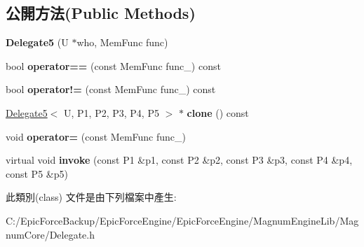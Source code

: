 \subsection*{公開方法(Public Methods)}
\begin{DoxyCompactItemize}
\item 
{\bfseries Delegate5} (U $\ast$who, Mem\+Func func)\hypertarget{class_magnum_1_1_delegate5_ac4e6c739aa5e8150b804e6457fdd6e50}{}\label{class_magnum_1_1_delegate5_ac4e6c739aa5e8150b804e6457fdd6e50}

\item 
bool {\bfseries operator==} (const Mem\+Func func\+\_\+) const \hypertarget{class_magnum_1_1_delegate5_a86f72d91bcddd075e49c60f88f0ca1d0}{}\label{class_magnum_1_1_delegate5_a86f72d91bcddd075e49c60f88f0ca1d0}

\item 
bool {\bfseries operator!=} (const Mem\+Func func\+\_\+) const \hypertarget{class_magnum_1_1_delegate5_a7b9775f4e023046f426041f2ba5ce5fc}{}\label{class_magnum_1_1_delegate5_a7b9775f4e023046f426041f2ba5ce5fc}

\item 
\hyperlink{class_magnum_1_1_delegate5}{Delegate5}$<$ U, P1, P2, P3, P4, P5 $>$ $\ast$ {\bfseries clone} () const \hypertarget{class_magnum_1_1_delegate5_accf265c3b4d4e95470a3b8b3af7fe3d0}{}\label{class_magnum_1_1_delegate5_accf265c3b4d4e95470a3b8b3af7fe3d0}

\item 
void {\bfseries operator=} (const Mem\+Func func\+\_\+)\hypertarget{class_magnum_1_1_delegate5_ae29a02b92e4befd2de2fa9919308f4ad}{}\label{class_magnum_1_1_delegate5_ae29a02b92e4befd2de2fa9919308f4ad}

\item 
virtual void {\bfseries invoke} (const P1 \&p1, const P2 \&p2, const P3 \&p3, const P4 \&p4, const P5 \&p5)\hypertarget{class_magnum_1_1_delegate5_afadca2650b3209343b8698de4e809737}{}\label{class_magnum_1_1_delegate5_afadca2650b3209343b8698de4e809737}

\end{DoxyCompactItemize}


此類別(class) 文件是由下列檔案中產生\+:\begin{DoxyCompactItemize}
\item 
C\+:/\+Epic\+Force\+Backup/\+Epic\+Force\+Engine/\+Epic\+Force\+Engine/\+Magnum\+Engine\+Lib/\+Magnum\+Core/Delegate.\+h\end{DoxyCompactItemize}
